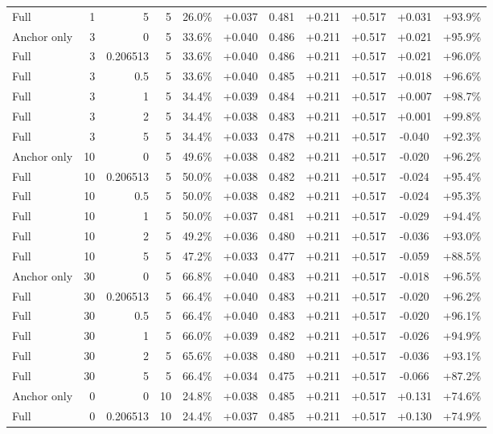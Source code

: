 \begin{table}[htbp]
\begin{tabular}{lrrrccccccc}
Full & 1 & 5 & 5 & 26.0\% & +0.037 & 0.481 & +0.211 & +0.517 & +0.031 & +93.9\% \\
Anchor only & 3 & 0 & 5 & 33.6\% & +0.040 & 0.486 & +0.211 & +0.517 & +0.021 & +95.9\% \\
Full & 3 & 0.206513 & 5 & 33.6\% & +0.040 & 0.486 & +0.211 & +0.517 & +0.021 & +96.0\% \\
Full & 3 & 0.5 & 5 & 33.6\% & +0.040 & 0.485 & +0.211 & +0.517 & +0.018 & +96.6\% \\
Full & 3 & 1 & 5 & 34.4\% & +0.039 & 0.484 & +0.211 & +0.517 & +0.007 & +98.7\% \\
Full & 3 & 2 & 5 & 34.4\% & +0.038 & 0.483 & +0.211 & +0.517 & +0.001 & +99.8\% \\
Full & 3 & 5 & 5 & 34.4\% & +0.033 & 0.478 & +0.211 & +0.517 & -0.040 & +92.3\% \\
Anchor only & 10 & 0 & 5 & 49.6\% & +0.038 & 0.482 & +0.211 & +0.517 & -0.020 & +96.2\% \\
Full & 10 & 0.206513 & 5 & 50.0\% & +0.038 & 0.482 & +0.211 & +0.517 & -0.024 & +95.4\% \\
Full & 10 & 0.5 & 5 & 50.0\% & +0.038 & 0.482 & +0.211 & +0.517 & -0.024 & +95.3\% \\
Full & 10 & 1 & 5 & 50.0\% & +0.037 & 0.481 & +0.211 & +0.517 & -0.029 & +94.4\% \\
Full & 10 & 2 & 5 & 49.2\% & +0.036 & 0.480 & +0.211 & +0.517 & -0.036 & +93.0\% \\
Full & 10 & 5 & 5 & 47.2\% & +0.033 & 0.477 & +0.211 & +0.517 & -0.059 & +88.5\% \\
Anchor only & 30 & 0 & 5 & 66.8\% & +0.040 & 0.483 & +0.211 & +0.517 & -0.018 & +96.5\% \\
Full & 30 & 0.206513 & 5 & 66.4\% & +0.040 & 0.483 & +0.211 & +0.517 & -0.020 & +96.2\% \\
Full & 30 & 0.5 & 5 & 66.4\% & +0.040 & 0.483 & +0.211 & +0.517 & -0.020 & +96.1\% \\
Full & 30 & 1 & 5 & 66.0\% & +0.039 & 0.482 & +0.211 & +0.517 & -0.026 & +94.9\% \\
Full & 30 & 2 & 5 & 65.6\% & +0.038 & 0.480 & +0.211 & +0.517 & -0.036 & +93.1\% \\
Full & 30 & 5 & 5 & 66.4\% & +0.034 & 0.475 & +0.211 & +0.517 & -0.066 & +87.2\% \\
Anchor only & 0 & 0 & 10 & 24.8\% & +0.038 & 0.485 & +0.211 & +0.517 & +0.131 & +74.6\% \\
Full & 0 & 0.206513 & 10 & 24.4\% & +0.037 & 0.485 & +0.211 & +0.517 & +0.130 & +74.9\% \\

\end{tabular}
\end{table}
